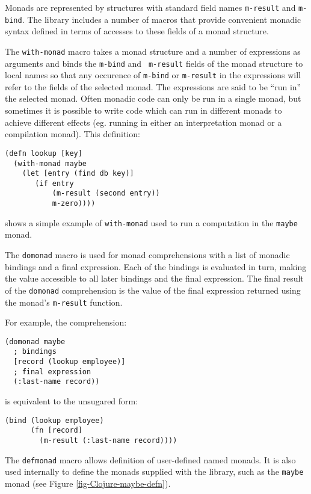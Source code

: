 \documentclass[natbib,10pt]{sigplanconf}
\begin{document}
Monads are represented by structures with standard field names
{\tt m-result} and {\tt m-bind}. The library includes a number of
macros that provide convenient monadic syntax defined in terms
of accesses to these fields of a monad structure.

The {\tt with-monad} macro takes a monad structure and a number of
expressions as arguments and binds the {\tt m-bind} and {\tt
  m-result} fields of the monad structure to local names so that any
occurence of {\tt m-bind} or {\tt m-result} in the expressions
will refer to the fields of the selected monad.  The expressions are
said to be ``run in'' the selected monad.  Often monadic code can only
be run in a single monad, but sometimes it is possible to write code
which can run in different monads to achieve different effects
(eg. running in either an interpretation monad or a compilation
monad).  This definition:
\begin{verbatim}
(defn lookup [key]
  (with-monad maybe
    (let [entry (find db key)]
       (if entry
           (m-result (second entry))
           m-zero))))
\end{verbatim}
shows a simple example of {\tt with-monad} used to run a computation
in the {\tt maybe} monad.

The {\tt domonad} macro is used for monad comprehensions with a list
of monadic bindings and a final expression.  Each of the bindings is
evaluated in turn, making the value accessible to all later bindings
and the final expression.  The final result of the {\tt domonad}
comprehension is the value of the final expression returned using
the monad's {\tt m-result} function.

For example, the comprehension:
\begin{verbatim}
(domonad maybe
  ; bindings
  [record (lookup employee)]
  ; final expression
  (:last-name record))
\end{verbatim}
is equivalent to the unsugared form:
\begin{verbatim}
(bind (lookup employee)
      (fn [record]
        (m-result (:last-name record))))
\end{verbatim}

The {\tt defmonad} macro allows definition of user-defined named
monads.  It is also used internally to define the monads supplied
with the library, such as the {\tt maybe} monad 
(see Figure \ref{fig-Clojure-maybe-defn}).
\end{document}
